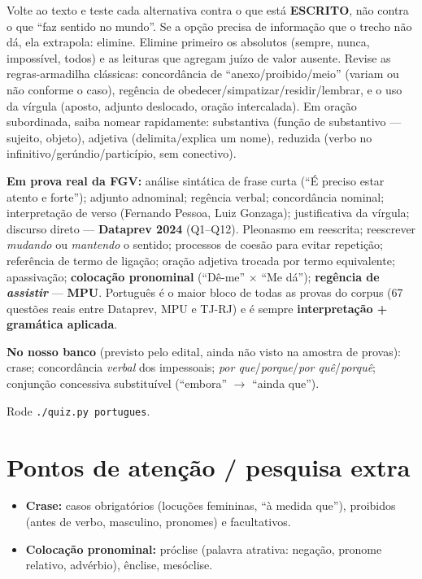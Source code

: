 \begin{comosair}
Volte ao texto e teste cada alternativa contra o que está \textbf{ESCRITO},
não contra o que ``faz sentido no mundo''. Se a opção precisa de informação
que o trecho não dá, ela extrapola: elimine. Elimine primeiro os absolutos
(sempre, nunca, impossível, todos) e as leituras que agregam juízo de valor
ausente. Revise as regras-armadilha clássicas: concordância de
``anexo/proibido/meio'' (variam ou não conforme o caso), regência de
obedecer/simpatizar/residir/lembrar, e o uso da vírgula (aposto, adjunto
deslocado, oração intercalada). Em oração subordinada, saiba nomear
rapidamente: substantiva (função de substantivo --- sujeito, objeto),
adjetiva (delimita/explica um nome), reduzida (verbo no
infinitivo/gerúndio/particípio, sem conectivo).
\end{comosair}

\begin{jacaiu}
\textbf{Em prova real da FGV:} análise sintática de frase curta (``É preciso
estar atento e forte''); adjunto adnominal; regência verbal; concordância
nominal; interpretação de verso (Fernando Pessoa, Luiz Gonzaga);
justificativa da vírgula; discurso direto --- \textbf{Dataprev 2024}
(Q1--Q12). Pleonasmo em reescrita; reescrever \emph{mudando} ou
\emph{mantendo} o sentido; processos de coesão para evitar repetição;
referência de termo de ligação; oração adjetiva trocada por termo
equivalente; apassivação; \textbf{colocação pronominal} (``Dê-me'' $\times$
``Me dá''); \textbf{regência de \emph{assistir}} --- \textbf{MPU}. Português
é o maior bloco de todas as provas do corpus (67 questões reais entre
Dataprev, MPU e TJ-RJ) e é sempre \textbf{interpretação + gramática
aplicada}.

\textbf{No nosso banco} (previsto pelo edital, ainda não visto na amostra de
provas): crase; concordância \emph{verbal} dos impessoais; \emph{por
que}/\emph{porque}/\emph{por quê}/\emph{porquê}; conjunção concessiva
substituível (``embora'' $\to$ ``ainda que'').

Rode \texttt{./quiz.py portugues}.
\end{jacaiu}

\section{Pontos de atenção / pesquisa extra}

\begin{itemize}
\item \textbf{Crase:} casos obrigatórios (locuções femininas, ``à medida
que''), proibidos (antes de verbo, masculino, pronomes) e facultativos.
\item \textbf{Colocação pronominal:} próclise (palavra atrativa: negação,
pronome relativo, advérbio), ênclise, mesóclise.
\end{itemize}
